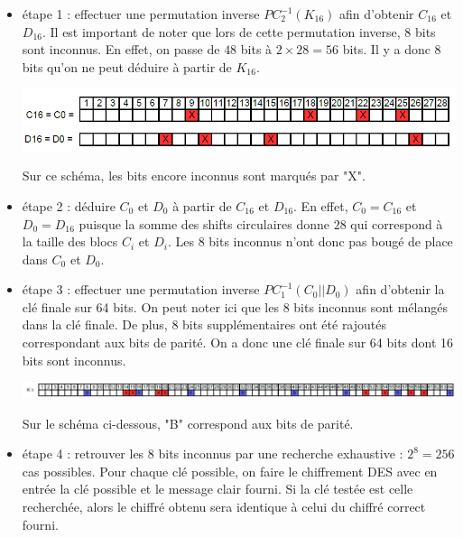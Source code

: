 \documentclass[11pt]{article}
\begin{document}
\begin{itemize}
	\item étape 1 : effectuer une permutation inverse $PC_{2}^{-1}(K_{16})$ afin d'obtenir $C_{16}$ et $D_{16}$.
	Il est important de noter que lors de cette permutation inverse, 8 bits sont inconnus. En effet, on passe de $48$ bits à $2 \times 28 = 56$ bits. Il y a donc 8 bits qu'on ne peut déduire à partir de $K_{16}$. \newline
	
	\begin{center}\includegraphics[scale=0.4]{../pictures/C0_D0.png}\end{center}
	
	Sur ce schéma, les bits encore inconnus sont marqués par "X". \newline
	
	
	\item étape 2 : déduire $C_{0}$ et $D_{0}$ à partir de $C_{16}$ et $D_{16}$. En effet, $C_{0}=C_{16}$ et $D_{0}=D_{16}$ puisque la somme des shifts circulaires donne $28$ qui correspond à la taille des blocs $C_i$ et $D_i$. Les 8 bits inconnus n'ont donc pas bougé de place dans $C_0$ et $D_0$. \newline
	
	\item étape 3 : effectuer une permutation inverse $PC_{1}^{-1}(C_{0}||D_{0})$ afin d'obtenir la clé finale sur 64 bits. On peut noter ici que les 8 bits inconnus sont mélangés dans la clé finale. De plus, 8 bits supplémentaires ont été rajoutés correspondant aux bits de parité. On a donc une clé finale sur 64 bits dont 16 bits sont inconnus. \newline
	
	\begin{center}\includegraphics[scale=0.5]{../pictures/K64.png}\end{center}
	
	Sur le schéma ci-dessous, "B" correspond aux bits de parité. \newline
	
	\item étape 4 : retrouver les 8 bits inconnus par une recherche exhaustive : $2^{8}=256$ cas possibles. Pour chaque clé possible, on faire le chiffrement DES avec en entrée la clé possible et le message clair fourni. Si la clé testée est celle recherchée, alors le chiffré obtenu sera identique à celui du chiffré correct fourni. \newline
	

\end{itemize}
\end{document}
